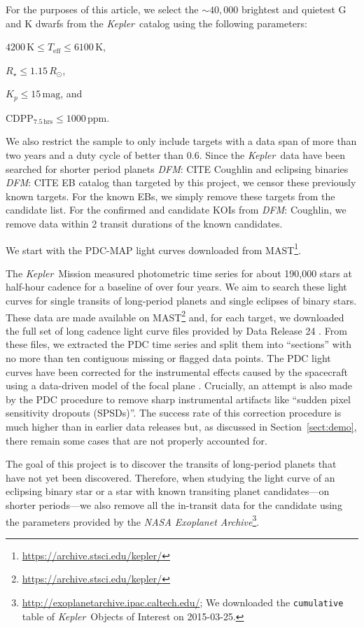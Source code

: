 \documentclass[12pt,preprint]{aastex}
\newcommand{\project}[1]{\textsl{#1}}
\newcommand{\kepler}{\project{Kepler}}
\newcommand{\paper}{article}
\newcommand{\sectionname}{Section}
\newcommand{\sectref}[1]{\ref{sect:#1}}
\newcommand{\Sect}[1]{\sectionname~\sectref{#1}}
\newcommand{\sect}[1]{\Sect{#1}}
\newcommand{\todo}[3]{{\color{#2}\emph{#1}: #3}}
\newcommand{\dfmtodo}[1]{\todo{DFM}{red}{#1}}
\newcommand{\unit}[1]{{\ensuremath{\,\mathrm{#1}}}}
\begin{document}
For the purposes of this \paper, we select the $\sim40,000$ brightest and
quietest G and K dwarfs from the \kepler\ catalog using the following
parameters:
\begin{itemize}
{\item $4200\unit{K} \le T_\mathrm{eff} \le 6100\unit{K}$,}
{\item $R_\star \le 1.15\,R_\odot$,}
{\item $K_p \le 15\unit{mag}$, and}
{\item $\mathrm{CDPP}_{7.5\unit{hrs}} \le 1000\unit{ppm}$.}
\end{itemize}
We also restrict the sample to only include targets with a data span of more
than two years and a duty cycle of better than $0.6$.
Since the \kepler\ data have been searched for shorter period planets
\dfmtodo{CITE Coughlin} and eclipsing binaries \dfmtodo{CITE EB catalog} than
targeted by this project, we censor these previously known targets.
For the known EBs, we simply remove these targets from the candidate list.
For the confirmed and candidate KOIs from \dfmtodo{Coughlin}, we remove data
within 2 transit durations of the known candidates.


We start with the PDC-MAP light curves downloaded from
MAST\footnote{\url{https://archive.stsci.edu/kepler/}}.



The \kepler\ Mission measured photometric time series for about 190,000 stars
at half-hour cadence for a baseline of over four years.
We aim to search these light curves for single transits of long-period planets
and single eclipses of binary stars.
These data are made available on
MAST\footnote{\url{https://archive.stsci.edu/kepler/}} and, for each target,
we downloaded the full set of long cadence light curve files provided by Data
Release 24 \citep{Thompson:2015}.
From these files, we extracted the PDC time series and split them into
``sections'' with no more than ten contiguous missing or flagged data points.
The PDC light curves have been corrected for the instrumental effects caused
by the spacecraft using a data-driven model of the focal plane
\citep{Stumpe:2012, Smith:2012}.
Crucially, an attempt is also made by the PDC procedure to remove sharp
instrumental artifacts like ``sudden pixel sensitivity dropouts (SPSDs)''.
The success rate of this correction procedure is much higher than in earlier
data releases but, as discussed in \sect{demo}, there remain some cases that
are not properly accounted for.

The goal of this project is to discover the transits of long-period planets
that have not yet been discovered.
Therefore, when studying the light curve of an eclipsing binary star or a star
with known transiting planet candidates---on shorter periods---we also remove
all the in-transit data for the candidate using the parameters provided by the
\project{NASA Exoplanet
Archive}\footnote{\url{http://exoplanetarchive.ipac.caltech.edu/}; We
downloaded the \texttt{cumulative} table of \kepler\ Objects of Interest on
2015-03-25.}.
\end{document}

